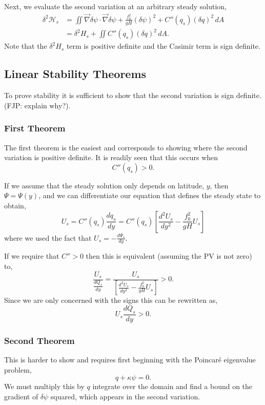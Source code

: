 \documentclass[12pt]{article}
\begin{document}
    Next, we evaluate the second variation at an arbitrary steady solution,
    \begin{align*}
    \delta^2 \mathcal{H}_s 
    & = \iint \vec\nabla \delta \psi \cdot \vec \nabla \delta \psi + \frac{f_0^2}{gH} (\delta \psi)^2+  C''(q_s) (\delta q)^2  \, dA \\
    & = \delta^2 H_s + \iint C''(q_s) (\delta q)^2  \, dA.
    \end{align*}
    Note that the $\delta^2 H_s$ term is positive definite and the Casimir term is sign definite.
  
  \subsection{Linear Stability Theorems}
  To prove stability it is sufficient to show that the second variation is sign definite. (FJP: explain why?).  
  
  \subsubsection{First Theorem}
    The first theorem is the easiest and corresponds to showing where the second variation is positive definite.  It is readily seen that this occurs when
    $$
    C''(q_s) > 0.
    $$
  
    If we assume that the steady solution only depends on latitude, $y$, then $\Psi = \Psi(y)$, and we can differentiate our equation that defines the steady state to obtain,
    $$
    U_s = C''(q_s) \frac{dq_s}{dy} = C''(q_s) \left[ \frac{d^2 U_s}{dy^2} - \frac{f_0^2}{gH} U_s \right]
    $$
    where we used the fact that $U_s = - \frac{d \Psi_s}{dy}$.
    
    If we require that $C'' > 0$ then this is equivalent (assuming the PV is not zero) to,
    $$
    \frac{U_s}{\frac{dQ_s}{dy}} = \frac{U_s}{\left[ \frac{d^2 U_s}{dy^2} - \frac{f_0^2}{gH} U_s\right]} > 0.
    $$
    Since we are only concerned with the signs this can be rewritten as,
    $$
    U_s \frac{d Q_s}{dy} > 0.
    $$
  
  \subsubsection{Second Theorem}
    This is harder to show and requires first beginning with the Poincar\'e eigenvalue problem,
    $$
    q + \kappa \psi = 0.
    $$
    We must multiply this by $q$ integrate over the domain and find a bound on the gradient of $\delta \psi$ squared, which appears in the second variation.
    
\end{document}

